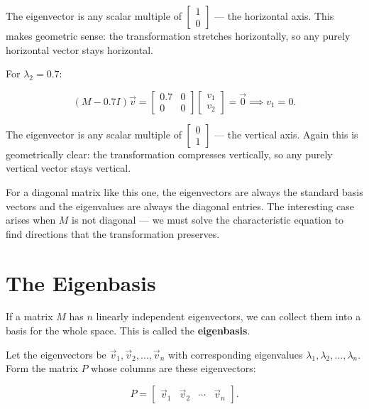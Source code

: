 \documentclass[11pt,openany]{book}
\theoremstyle{definition}
\begin{document}
The eigenvector is any scalar multiple of $\begin{bmatrix} 1 \\ 0 \end{bmatrix}$ 
--- the horizontal axis. This makes geometric sense: the transformation stretches 
horizontally, so any purely horizontal vector stays horizontal.

\medskip

For $\lambda_2 = 0.7$:

\[
(M - 0.7I)\vec{v} = 
\begin{bmatrix} 0.7 & 0 \\ 0 & 0 \end{bmatrix}
\begin{bmatrix} v_1 \\ v_2 \end{bmatrix} = \vec{0}
\implies v_1 = 0.
\]

The eigenvector is any scalar multiple of $\begin{bmatrix} 0 \\ 1 \end{bmatrix}$ 
--- the vertical axis. Again this is geometrically clear: the transformation 
compresses vertically, so any purely vertical vector stays vertical.

\medskip

For a diagonal matrix like this one, the eigenvectors are always the standard basis 
vectors and the eigenvalues are always the diagonal entries. The interesting case 
arises when $M$ is not diagonal --- we must solve the characteristic equation to 
find directions that the transformation preserves.

\section{The Eigenbasis}

If a matrix $M$ has $n$ linearly independent eigenvectors, we can collect them into 
a basis for the whole space. This is called the \textbf{eigenbasis}.

\medskip

Let the eigenvectors be $\vec{v}_1, \vec{v}_2, \ldots, \vec{v}_n$ with corresponding 
eigenvalues $\lambda_1, \lambda_2, \ldots, \lambda_n$. Form the matrix $P$ whose 
columns are these eigenvectors:

\[
P = \begin{bmatrix} \vec{v}_1 & \vec{v}_2 & \cdots & \vec{v}_n \end{bmatrix}.
\]
\end{document}

